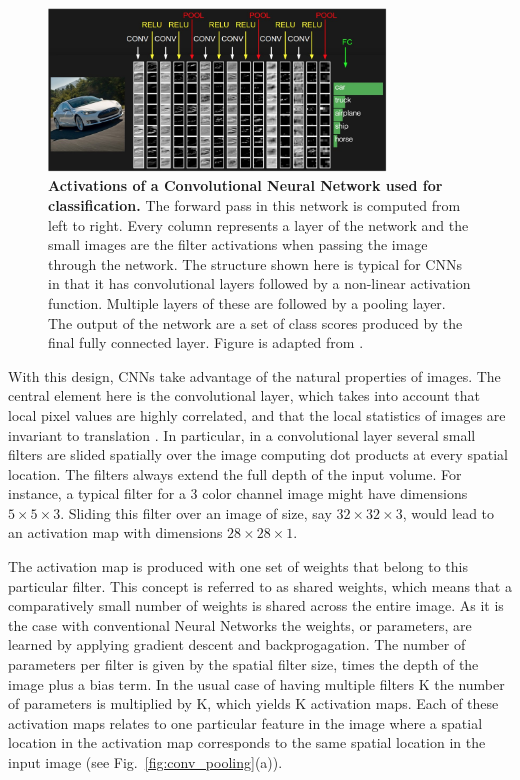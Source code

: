 \begin{figure}[h!]
	\centering
	\captionsetup{width=1\linewidth}
	\includegraphics[width=0.8\textwidth]{Figures/convnet.png}
	\caption{\textbf{Activations of a Convolutional Neural Network used for classification.} The forward pass in this network is computed from left to right. Every column represents a layer of the network and the small images are the filter activations when passing the image through the network. The structure shown here is typical for CNNs in that it has convolutional layers followed by a non-linear activation function. Multiple layers of these are followed by a pooling layer. The output of the network are a set of class scores produced by the final fully connected layer. Figure is adapted from \parencite{cs231}.}
	\label{fig:convnet}
\end{figure}

With this design, CNNs take advantage of the natural properties of images. The central element here is the convolutional layer, which takes into account that local pixel values are highly correlated, and that the local statistics of images are invariant to translation \parencite{lawrence1997}. In particular, in a convolutional layer several small filters are slided spatially over the image computing dot products at every spatial location. The filters always extend the full depth of the input volume. For instance, a typical filter for a 3 color channel image might have dimensions $5 \times 5 \times 3$. Sliding this filter over an image of size, say  $32\times32\times3$, would lead to an activation map with dimensions $28\times28\times1$. 

The activation map is produced with one set of weights that belong to this particular filter. This concept is referred to as shared weights, which means that a comparatively small number of weights is shared across the entire image. As it is the case with conventional Neural Networks the weights, or parameters, are learned by applying gradient descent and backprogagation.  The number of parameters per filter is given by the spatial filter size, times the depth of the image plus a bias term. In the usual case of having multiple filters K the number of parameters is multiplied by K, which yields K activation maps. Each of these activation maps relates to one particular feature in the image where a spatial location in the activation map corresponds to the same spatial location in the input image (see Fig.~\ref{fig:conv_pooling}(a)). 

